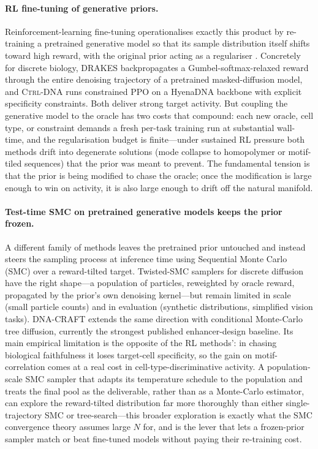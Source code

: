 \documentclass{article}
\theoremstyle{definition}
\theoremstyle{remark}
\newcommand{\drakes}{\textsc{DRAKES}\xspace}
\newcommand{\ctrldna}{\textsc{Ctrl-DNA}\xspace}
\newcommand{\dnacraft}{\textsc{DNA-CRAFT}\xspace}
\begin{document}
\paragraph{RL fine-tuning of generative priors.}
Reinforcement-learning fine-tuning operationalises exactly this product by re-training a pretrained generative model so that its sample distribution itself shifts toward high reward, with the original prior acting as a regulariser \citep{ouyang2022rlhf}. Concretely for discrete biology, \drakes{} \citep{drakes2024} backpropagates a Gumbel-softmax-relaxed reward through the entire denoising trajectory of a pretrained masked-diffusion model, and \ctrldna{} \citep{ctrldna2025} runs constrained PPO on a HyenaDNA backbone with explicit specificity constraints. Both deliver strong target activity. But coupling the generative model to the oracle has two costs that compound: each new oracle, cell type, or constraint demands a fresh per-task training run at substantial wall-time, and the regularisation budget is finite---under sustained RL pressure both methods drift into degenerate solutions (mode collapse to homopolymer or motif-tiled sequences) that the prior was meant to prevent. The fundamental tension is that the prior is being modified to chase the oracle; once the modification is large enough to win on activity, it is also large enough to drift off the natural manifold.

\paragraph{Test-time SMC on pretrained generative models keeps the prior frozen.}
A different family of methods leaves the pretrained prior untouched and instead steers the sampling process at inference time using Sequential Monte Carlo (SMC) over a reward-tilted target. Twisted-SMC samplers for discrete diffusion \citep{lee2025debiasing,paniouli2025} have the right shape---a population of particles, reweighted by oracle reward, propagated by the prior's own denoising kernel---but remain limited in scale (small particle counts) and in evaluation (synthetic distributions, simplified vision tasks). \dnacraft{} \citep{dnacraft2026} extends the same direction with conditional Monte-Carlo tree diffusion, currently the strongest published enhancer-design baseline. Its main empirical limitation is the opposite of the RL methods': in chasing biological faithfulness it loses target-cell specificity, so the gain on motif-correlation comes at a real cost in cell-type-discriminative activity. A population-scale SMC sampler that adapts its temperature schedule to the population and treats the final pool as the deliverable, rather than as a Monte-Carlo estimator, can explore the reward-tilted distribution far more thoroughly than either single-trajectory SMC or tree-search---this broader exploration is exactly what the SMC convergence theory assumes large $N$ for, and is the lever that lets a frozen-prior sampler match or beat fine-tuned models without paying their re-training cost.
\end{document}
